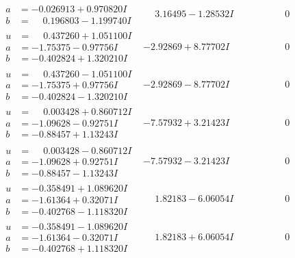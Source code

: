 \documentclass[1p]{elsarticle_modified}
\theoremstyle{definition}
\begin{document}
$$\begin{array}{c|c|c}
\begin{aligned}
a &= -0.026913 + 0.970820 I \\
b &= \phantom{-}0.196803 - 1.199740 I\end{aligned}
 & \phantom{-}3.16495 - 1.28532 I & \phantom{-0.000000 } 0 \\ \hline\begin{aligned}
u &= \phantom{-}0.437260 + 1.051100 I \\
a &= -1.75375 - 0.97756 I \\
b &= -0.402824 + 1.320210 I\end{aligned}
 & -2.92869 + 8.77702 I & \phantom{-0.000000 } 0 \\ \hline\begin{aligned}
u &= \phantom{-}0.437260 - 1.051100 I \\
a &= -1.75375 + 0.97756 I \\
b &= -0.402824 - 1.320210 I\end{aligned}
 & -2.92869 - 8.77702 I & \phantom{-0.000000 } 0 \\ \hline\begin{aligned}
u &= \phantom{-}0.003428 + 0.860712 I \\
a &= -1.09628 - 0.92751 I \\
b &= -0.88457 + 1.13243 I\end{aligned}
 & -7.57932 + 3.21423 I & \phantom{-0.000000 } 0 \\ \hline\begin{aligned}
u &= \phantom{-}0.003428 - 0.860712 I \\
a &= -1.09628 + 0.92751 I \\
b &= -0.88457 - 1.13243 I\end{aligned}
 & -7.57932 - 3.21423 I & \phantom{-0.000000 } 0 \\ \hline\begin{aligned}
u &= -0.358491 + 1.089620 I \\
a &= -1.61364 + 0.32071 I \\
b &= -0.402768 - 1.118320 I\end{aligned}
 & \phantom{-}1.82183 - 6.06054 I & \phantom{-0.000000 } 0 \\ \hline\begin{aligned}
u &= -0.358491 - 1.089620 I \\
a &= -1.61364 - 0.32071 I \\
b &= -0.402768 + 1.118320 I\end{aligned}
 & \phantom{-}1.82183 + 6.06054 I & \phantom{-0.000000 } 0 \\ \hline\begin{aligned}

\end{aligned}
\end{array}$$
\end{document}
